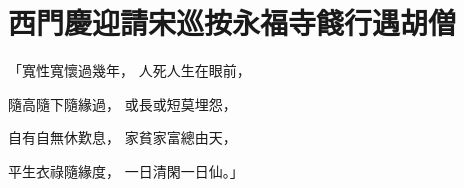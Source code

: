 %

\chapter{西門慶迎請宋巡按\KG 永福寺餞行遇胡僧}


\begin{showcontents}{}



「寬性寬懷過幾年，  人死人生在眼前，

隨高隨下隨緣過，  或長或短莫埋怨，

自有自無休歎息，  家貧家富總由天，

平生衣祿隨緣度，  一日清閑一日仙。」


\end{showcontents}
